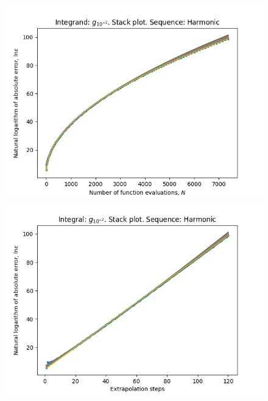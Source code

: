 \begin{figure}[H]
\centering
\begin{minipage}{0.45\textwidth}
\centering
\includegraphics[scale=0.45]{../results/romberg_plots/g_hundredth_hp_harmonic_stack.png}
\end{minipage}
\begin{minipage}{0.45\textwidth}
\centering
\includegraphics[scale=0.45]{../results/romberg_plots/g_hundredth_hp_harmonic_steps_stack.png}
\end{minipage}
\end{figure}

